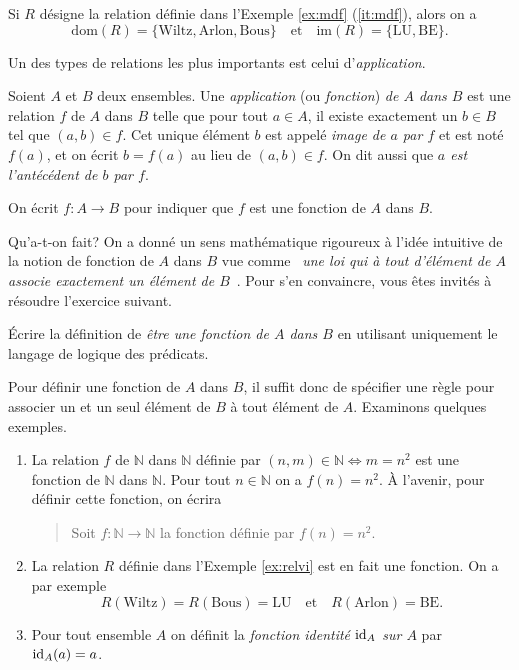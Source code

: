 \documentclass[french,course,oneside,theoremnosection]{lecture}
\newcommand{\N}{\mathbb{N}}
\newcommand{\dom}{\mathrm{dom}}
\newcommand{\im}{\mathrm{im}}
\begin{document}
\begin{example}\label{ex:relvi}
Si $R$ désigne la relation définie dans l'Exemple \ref{ex:mdf} (\ref{it:mdf}), alors on a 
\[
\dom(R)=\{\text{Wiltz}, \text{Arlon}, \text{Bous}\} \quad \text{et} \quad \im(R)=\{\text{LU}, \text{BE}\}.
\]
\end{example}

Un des types de relations les plus importants est celui d'\emph{application}.

\begin{definition}
Soient $A$ et $B$ deux ensembles. Une \emph{application} (ou \emph{fonction}) \emph{de $A$ dans $B$} est une relation $f$ de $A$ dans $B$ telle que pour tout $a\in A$, il existe exactement un $b\in B$  tel que $(a,b)\in f$. Cet unique élément $b$ est appelé \emph{image de $a$ par $f$} et est noté $f(a)$, et on écrit $b=f(a)$ au lieu de $(a,b)\in f$. On dit aussi que \emph{$a$ est l'antécédent de $b$ par $f$}.

On écrit $f\colon A \to B$ pour indiquer que $f$ est une fonction de $A$ dans $B$.
\end{definition}

Qu'a-t-on fait? On a donné un sens mathématique rigoureux à l'idée intuitive de la notion de fonction de $A$ dans $B$ vue comme \og~\emph{une loi qui à tout d'élément de $A$ associe exactement un élément de $B$}~\fg{}. Pour s'en convaincre, vous êtes invités à résoudre l'exercice suivant.

\begin{exercise}
Écrire la définition de \emph{être une fonction de $A$ dans $B$} en utilisant uniquement le langage de logique des prédicats.
\end{exercise}

Pour définir une fonction de $A$ dans $B$, il suffit donc de spécifier une règle pour associer un et un seul élément de $B$ à tout élément de $A$. Examinons quelques exemples.

\begin{example}\label{ex:cfg}
\begin{enumerate}
\item La relation $f$ de $\N$ dans $\N$ définie par $(n,m) \in  \N \iff m=n^2$ est une fonction de $\N$ dans $\N$. Pour tout $n\in \N$ on a $f(n)=n^2$. À l'avenir, pour définir cette fonction, on écrira
\begin{quotation}
Soit $f\colon \N \to \N$ la fonction définie par $f(n)=n^2$.
\end{quotation}
\item La relation $R$ définie dans l'Exemple \ref{ex:relvi} est en fait une fonction. On a par exemple
\[
R(\text{Wiltz})=R(\text{Bous})=\text{LU} \quad \text{et} \quad R(\text{Arlon})=\text{BE}.
\]
\item Pour tout ensemble $A$ on définit la \emph{fonction identité $\operatorname{id}_A$ sur $A$} par $\operatorname{id}_A(a)=a$.
\end{enumerate}
\end{example}
\end{document}
